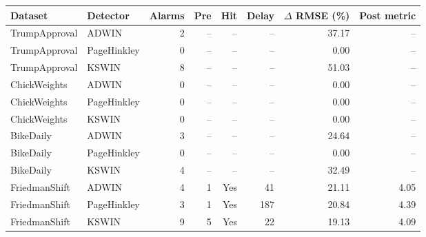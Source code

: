 \begin{tabular}{llrrrrrr}
\toprule
Dataset & Detector & Alarms & Pre & Hit & Delay & $\Delta$ RMSE (\%) & Post metric \\
\midrule
TrumpApproval & ADWIN & 2 & -- & -- & -- & 37.17 & -- \\
TrumpApproval & PageHinkley & 0 & -- & -- & -- & 0.00 & -- \\
TrumpApproval & KSWIN & 8 & -- & -- & -- & 51.03 & -- \\
ChickWeights & ADWIN & 0 & -- & -- & -- & 0.00 & -- \\
ChickWeights & PageHinkley & 0 & -- & -- & -- & 0.00 & -- \\
ChickWeights & KSWIN & 0 & -- & -- & -- & 0.00 & -- \\
BikeDaily & ADWIN & 3 & -- & -- & -- & 24.64 & -- \\
BikeDaily & PageHinkley & 0 & -- & -- & -- & 0.00 & -- \\
BikeDaily & KSWIN & 4 & -- & -- & -- & 32.49 & -- \\
FriedmanShift & ADWIN & 4 & 1 & Yes & 41 & 21.11 & 4.05 \\
FriedmanShift & PageHinkley & 3 & 1 & Yes & 187 & 20.84 & 4.39 \\
FriedmanShift & KSWIN & 9 & 5 & Yes & 22 & 19.13 & 4.09 \\
\bottomrule
\end{tabular}
